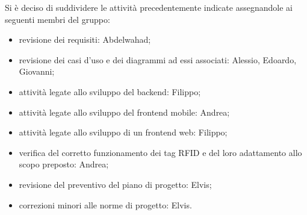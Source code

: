 Si è deciso di suddividere le attività precedentemente indicate assegnandole ai seguenti membri del gruppo:
\begin{itemize}
	\item revisione dei requisiti: Abdelwahad;
	\item revisione dei casi d'uso e dei diagrammi ad essi associati: Alessio, Edoardo, Giovanni;
	\item attività legate allo sviluppo del backend: Filippo;
	\item attività legate allo sviluppo del frontend mobile: Andrea;
	\item attività legate allo sviluppo di un frontend web: Filippo;
	\item verifica del corretto funzionamento dei tag RFID e del loro adattamento allo scopo preposto: Andrea;
	\item revisione del preventivo del piano di progetto: Elvis;
	\item correzioni minori alle norme di progetto: Elvis.
\end{itemize}

